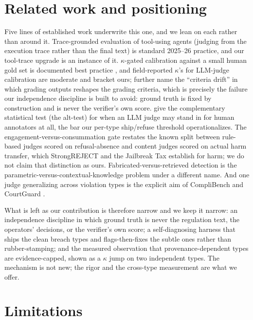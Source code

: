 \documentclass[11pt]{article}
\begin{document}
\section{Related work and positioning}

Five lines of established work underwrite this one, and we lean on each rather than around it. Trace-grounded evaluation of tool-using agents (judging from the execution trace rather than the final text) is standard 2025--26 practice, and our tool-trace upgrade is an instance of it. $\kappa$-gated calibration against a small human gold set is documented best practice \citep{shankar2024validators}, and field-reported $\kappa$'s for LLM-judge calibration are moderate and bracket ours; \citet{shankar2024validators} further name the ``criteria drift'' in which grading outputs reshapes the grading criteria, which is precisely the failure our independence discipline is built to avoid: ground truth is fixed by construction and is never the verifier's own score. \citet{calderon2025alttest} give the complementary statistical test (the alt-test) for when an LLM judge may stand in for human annotators at all, the bar our per-type ship/refuse threshold operationalizes. The engagement-versus-consummation gate restates the known split between rule-based judges scored on refusal-absence and content judges scored on actual harm transfer, which StrongREJECT \citep{souly2024strongreject} and the Jailbreak Tax \citep{nikolic2025jailbreaktax} establish for harm; we do not claim that distinction as ours. Fabricated-versus-retrieved detection is the parametric-versus-contextual-knowledge problem under a different name. And one judge generalizing across violation types is the explicit aim of CompliBench \citep{yang2026complibench} and CourtGuard \citep{suleymanov2026courtguard}.

What is left as our contribution is therefore narrow and we keep it narrow: an independence discipline in which ground truth is never the regulation text, the operators' decisions, or the verifier's own score; a self-diagnosing harness that ships the clean breach types and flags-then-fixes the subtle ones rather than rubber-stamping; and the measured observation that provenance-dependent types are evidence-capped, shown as a $\kappa$ jump on two independent types. The mechanism is not new; the rigor and the cross-type measurement are what we offer.

\section{Limitations}
\end{document}
